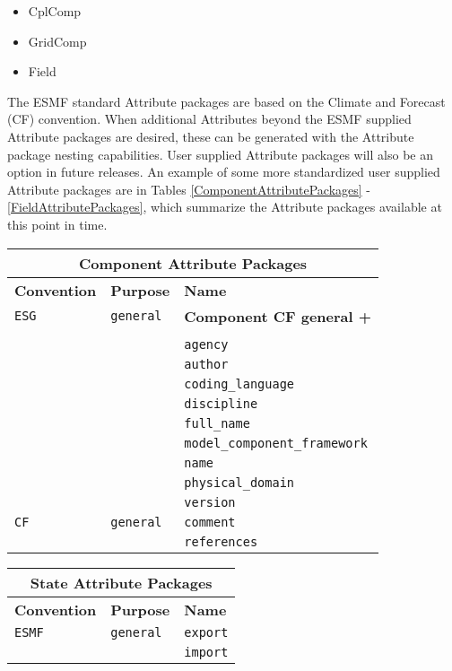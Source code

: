 \begin{itemize}
\item CplComp
\item GridComp
\item Field
\end{itemize}

The ESMF standard Attribute packages are based on the Climate and Forecast (CF) convention.  When additional Attributes beyond the ESMF supplied Attribute packages are desired, these can be generated with the Attribute package nesting capabilities.  User supplied Attribute packages will also be an option in future releases.  An example of some more standardized user supplied Attribute packages are in Tables \ref{ComponentAttributePackages} - \ref{FieldAttributePackages}, which summarize the Attribute packages available at this point in time.

\vspace{18pt}

\begin{tabular}{|p{4cm}|p{4cm}|p{6cm}|}
\hline
\multicolumn{3}{|c|}{{\bf \large Component Attribute Packages}} \\
\hline\hline
{\bf Convention} & {\bf Purpose} & {\bf Name} \\
\hline\hline
{\tt ESG} & {\tt general} & {\bf Component CF general +} \\
     & & \\
     & & {\tt agency} \\
     & & {\tt author} \\
     & & {\tt coding\_language}  \\
     & & {\tt discipline}  \\
     & & {\tt full\_name} \\
     & & {\tt model\_component\_framework} \\
     & & {\tt name} \\
     & & {\tt physical\_domain}\\
     & & {\tt version} \\ 
\hline
{\tt CF} & {\tt general} & {\tt comment}\\
     & & {\tt references} \\
\hline
\end{tabular}
\label{ComponentAttributePackages}

\vspace{18pt}

\begin{tabular}{|p{4cm}|p{4cm}|p{6cm}|}
\hline
\multicolumn{3}{|c|}{{\bf \large State Attribute Packages}} \\
\hline\hline
{\bf Convention} & {\bf Purpose} & {\bf Name} \\
\hline\hline
{\tt ESMF} & {\tt general} & {\tt export}  \\
 & & {\tt import} \\ 
\hline
\end{tabular}
\label{StateAttributePackages}

